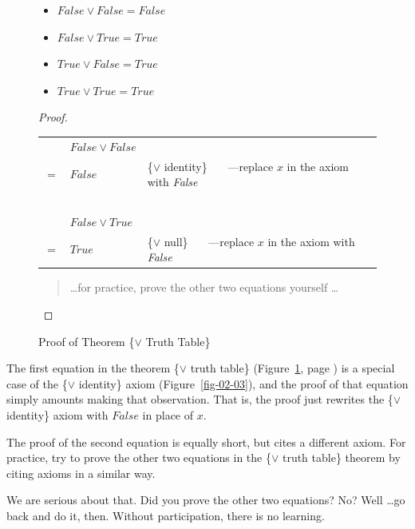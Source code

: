 \begin{figure}
\begin{theorem}
\mbox{}
\begin{itemize}
\item $False \vee False = False$
\item $False \vee True  = True$
\item $True  \vee False = True$
\item $True  \vee True  = True$
\end{itemize}
\end{theorem}

\begin{proof}
\mbox{}\\
\begin{tabular}{lll}
    &$False \vee False$    & \\
$=$ & $False$              & \{$\vee$ identity\}  ~~~---replace $x$ in the axiom with \emph{False}\\
    &  ~                   & \\
    & $False \vee True$    & \\
$=$ & $True$               & \{$\vee$ null\}  ~~~---replace $x$ in the axiom with \emph{False}\\
\end{tabular}
\begin{quote}
\dots for practice, prove the other two equations yourself \dots
\end{quote}
\end{proof}
\caption{Proof of Theorem \{$\vee$ Truth Table\}}
\label{or-truth-table}
\end{figure}

The first equation in the theorem \{$\vee$ truth table\}
(Figure~\ref{or-truth-table}, page \pageref{or-truth-table})
is a special case of the
\{$\vee$ identity\} axiom (Figure~\ref{fig-02-03}),
and the proof of that equation simply amounts making that observation.
That is, the proof just rewrites the \{$\vee$ identity\} axiom
with $False$ in place of $x$.

The proof of the second equation is equally short, but cites
a different axiom.
For practice, try to prove the other two
equations in the \{$\vee$ truth table\} theorem
by citing axioms in a similar way.

We are serious about that. Did you prove the other two equations?
No? Well \dots go back and do it, then. Without participation, there
is no learning.

